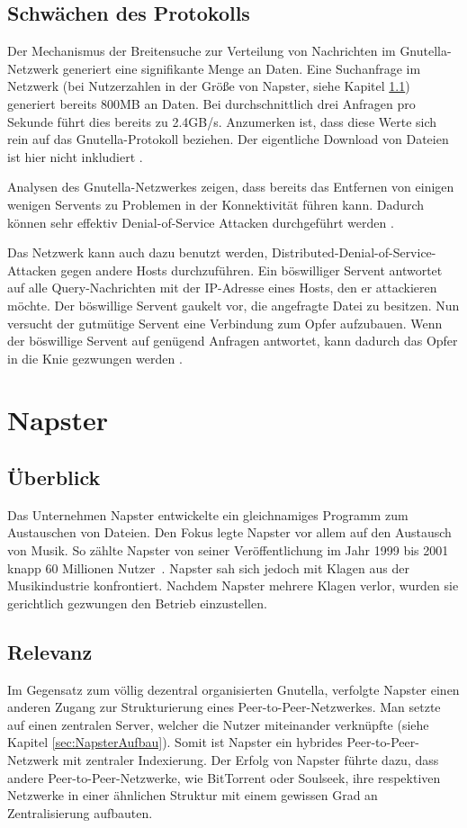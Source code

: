 \subsection{Schwächen des Protokolls}
\label{sec:GnutellaWeaknesses}
Der Mechanismus der Breitensuche zur Verteilung von Nachrichten im Gnutella-Netz\-werk generiert eine signifikante Menge an Daten. Eine Suchanfrage im Netzwerk (bei Nutzerzahlen in der Größe von Napster, siehe Kapitel \ref{sec:NapsterÜberblick}) generiert bereits 800MB an Daten. Bei durchschnittlich drei Anfragen pro Sekunde führt dies bereits zu 2.4GB/s. Anzumerken ist, dass diese Werte sich rein auf das Gnutella-Protokoll beziehen. Der eigentliche Download von Dateien ist hier nicht inkludiert  \parencite{ritter2001gnutella}.

Analysen des Gnutella-Netzwerkes zeigen, dass bereits das Entfernen von einigen wenigen Servents zu Problemen in der Konnektivität führen kann. Dadurch können sehr effektiv Denial-of-Service Attacken durchgeführt werden \parencite{ripeanu2001peer}. 

Das Netzwerk kann auch dazu benutzt werden, Distributed-Denial-of-Ser\-vice-At\-tacken gegen andere Hosts durchzuführen. Ein böswilliger Servent antwortet auf alle Query-Nachrichten mit der IP-Adresse eines Hosts, den er attackieren möchte. Der böswillige Servent gaukelt vor, die angefragte Datei zu besitzen. Nun versucht der gutmütige Servent eine Verbindung zum Opfer aufzubauen. Wenn der böswillige Servent auf genügend Anfragen antwortet, kann dadurch das Opfer in die Knie gezwungen werden \parencite{zeinalipour2002exploiting}.

\section{Napster}
\subsection{Überblick}
\label{sec:NapsterÜberblick}
Das Unternehmen Napster entwickelte ein gleichnamiges Programm zum Austauschen von Dateien. Den Fokus legte Napster vor allem auf den Austausch von Musik. So zählte Napster von seiner Veröffentlichung im Jahr 1999 bis 2001 knapp 60 Millionen Nutzer~\parencite{poblocki2001napster}. Napster sah sich jedoch mit Klagen aus der Musikindustrie konfrontiert. Nachdem Napster mehrere Klagen verlor, wurden sie gerichtlich gezwungen den Betrieb einzustellen.

\subsection{Relevanz}
Im Gegensatz zum völlig dezentral organisierten Gnutella, verfolgte Napster einen anderen Zugang zur Strukturierung eines Peer-to-Peer-Netzwerkes. Man setzte auf einen zentralen Server,
 welcher die Nutzer miteinander verknüpfte (siehe Kapitel \ref{sec:NapsterAufbau}). Somit ist Napster ein hybrides Peer-to-Peer-Netzwerk mit zentraler Indexierung. Der Erfolg von Napster führte dazu, dass andere Peer-to-Peer-Netzwerke, wie BitTorrent oder Soulseek, ihre respektiven Netzwerke in einer ähnlichen Struktur mit einem gewissen Grad an Zentralisierung aufbauten. 


